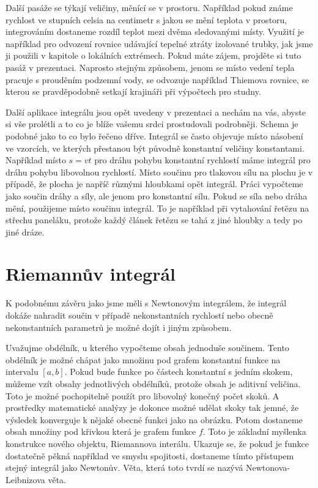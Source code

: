 \documentclass[12pt]{article}
\begin{document}
Další pasáže se týkají veličiny, měnící se v prostoru. Například pokud známe rychlost ve stupních celsia na centimetr s jakou se mění teplota v prostoru, integrováním dostaneme rozdíl teplot mezi dvěma sledovanými místy. Využití je například pro odvození rovnice udávající tepelné ztráty izolované trubky, jak jsme ji použili v kapitole o lokálních extrémech. Pokud máte zájem, projděte si tuto pasáž v prezentaci. Naprosto stejným způsobem, jenom se místo vedení tepla pracuje s prouděním podzemní vody, se odvozuje například Thiemova rovnice, se kterou se pravděpodobně setkají krajináři při výpočtech pro studny.

Další aplikace integrálu jsou opět uvedeny v prezentaci a nechám na vás, abyste si vše prolétli a to co je blíže vašemu srdci prostudovali podrobněji. Schema je podobné jako to co bylo řečeno dříve. Integrál se často objevuje místo násobení ve vzorcích, ve kterých přestanou být původně konstantní veličiny konstantami. Například místo $s=vt$ pro dráhu pohybu konstantní rychlostí máme integrál pro dráhu pohybu libovolnou rychlostí. Místo součinu pro tlakovou sílu na plochu je v případě, že plocha je napříč různými hloubkami opět integrál. Práci vypočteme jako součin dráhy a síly, ale jenom pro konstantní sílu. Pokud se síla nebo dráha mění, použijeme místo součinu integrál. To je například při vytahování řetězu na střechu paneláku, protože každý článek řetězu se tahá z jiné hloubky a tedy po jiné dráze.

\section*{Riemannův integrál}

K podobnému závěru jako jsme měli s Newtonovým integrálem, že integrál dokáže nahradit součin v případě nekonstantních rychlostí nebo obecně nekonstantních parametrů je možné dojít i  jiným způsobem.

Uvažujme obdélník, u kterého vypočteme obsah jednoduše součinem. Tento obdélník je možné chápat jako množinu pod grafem konstantní funkce na intervalu $[a,b]$. Pokud bude funkce po částech konstantní s jedním skokem, můžeme vzít obsahy jednotlivých obdélníků, protože obsah je aditivní veličina. Toto je možné pochopitelně použít pro libovolný konečný počet skoků. A prostředky matematické analýzy je dokonce možné udělat skoky tak jemné, že výsledek konverguje k nějaké obecné funkci jako na obrázku. Potom dostaneme obsah množiny pod křivkou která je grafem funkce $f$. Toto je základní myšlenka konstrukce nového objektu, Riemannova interálu. Ukazuje se, že pokud je funkce dostatečně pěkná například ve smyslu spojitosti, dostaneme tímto přístupem stejný integrál jako Newtonův. Věta, která toto tvrdí se nazývá Newtonova-Leibnizova věta. 
\end{document}
